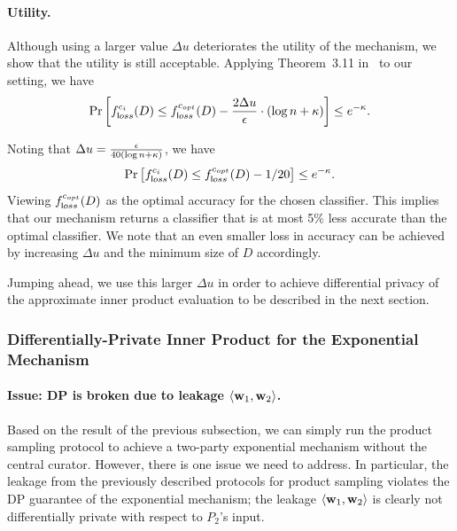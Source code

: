 
%
%

\paragraph{Utility.}
Although using a larger value $\Delta u$ deteriorates the utility of the
mechanism, we show that the utility is still acceptable.  Applying
Theorem~3.11
in~\cite{DR14} to our setting, we have $$\Pr\left[f_{\sf loss}^{c_i}(D)
\le f_{\sf loss}^{c_{opt}}(D) - \frac{2 \Delta u}{\e} \cdot (\log n + \secparam)
\right] \le e^{-\secparam}.$$ 

Noting that $\Delta u = \frac{\e}{40(\log
n + \secparam)}$, we have $$\Pr\left[f_{\sf loss}^{c_i}(D) \le f_{\sf
loss}^{c_{opt}}(D) - 1/20 \right] \le e^{-\secparam}.$$ 
Viewing $f_{\sf
loss}^{c_{opt}}(D)$ as the optimal accuracy for the chosen classifier.  This implies that our mechanism returns a classifier that is at most 5\% less accurate than the optimal classifier.  We note that an even smaller loss in accuracy can be achieved by increasing $\Delta u$ and the minimum size of $D$ accordingly.

Jumping ahead, we use this larger $\Delta u$ in order to achieve
differential privacy of the approximate inner product evaluation to be
described in the next section.

\subsubsection{Differentially-Private Inner Product for the Exponential Mechanism}

\paragraph{Issue: DP is broken due to leakage $\ipw$.}
Based on the result of the previous subsection, we can simply run the
product sampling protocol to achieve a two-party exponential mechanism
without the central curator. However, there is one issue we need to
address.
%
In particular, the leakage from the previously described protocols for
product sampling violates the DP guarantee of the exponential mechanism;
the leakage $\ipw$ is clearly not differentially private with respect to
$P_2$'s input.

